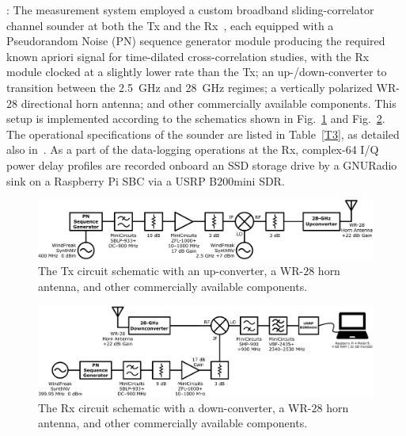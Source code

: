 \documentclass[12pt, draftcls, onecolumn]{IEEEtran}
\begin{document}
: The measurement system employed a custom broadband sliding-correlator channel sounder at both the Tx and the Rx~\cite{Purdue}, each equipped with a Pseudorandom Noise (PN) sequence generator module producing the required known apriori signal for time-dilated cross-correlation studies, with the Rx module clocked at a slightly lower rate than the Tx; an up-/down-converter to transition between the \SI{2.5}{\giga\hertz} and \SI{28}{\giga\hertz} regimes; a vertically polarized WR-$28$ directional horn antenna; and other commercially available components. This setup is implemented according to the schematics shown in Fig.~\ref{F2a} and Fig.~\ref{F2b}. The operational specifications of the sounder are listed in Table~\ref{T3}, as detailed also in~\cite{Purdue}. As a part of the data-logging operations at the Rx, complex-\SI{64}{} I/Q power delay profiles are recorded onboard an SSD storage drive by a GNURadio sink on a Raspberry Pi SBC via a USRP B$200$mini SDR.
\begin{figure} [t]
    \centering
    \includegraphics[width=1.0\linewidth]{figs/tx_schematic.png}
    \vspace{-6mm}
    \caption{The Tx circuit schematic with an up-converter, a WR-$28$ horn antenna, and other commercially available components.}
    \label{F2a}
    \vspace{-6mm}
\end{figure}
\begin{figure} [t]
    \centering
    \includegraphics[width=1.0\linewidth]{figs/rx_schematic.png}
    \vspace{-6mm}
    \caption{The Rx circuit schematic with a down-converter, a WR-$28$ horn antenna, and other commercially available components.}
    \label{F2b}
\end{figure}
\end{document}
